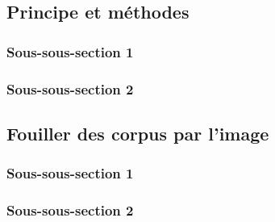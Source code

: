 
\subsection{Principe et méthodes}
    \subsubsection{Sous-sous-section 1}

    
    \subsubsection{Sous-sous-section 2}


    \subsection{Fouiller des corpus par l’image}
        \subsubsection{Sous-sous-section 1}


        \subsubsection{Sous-sous-section 2}

